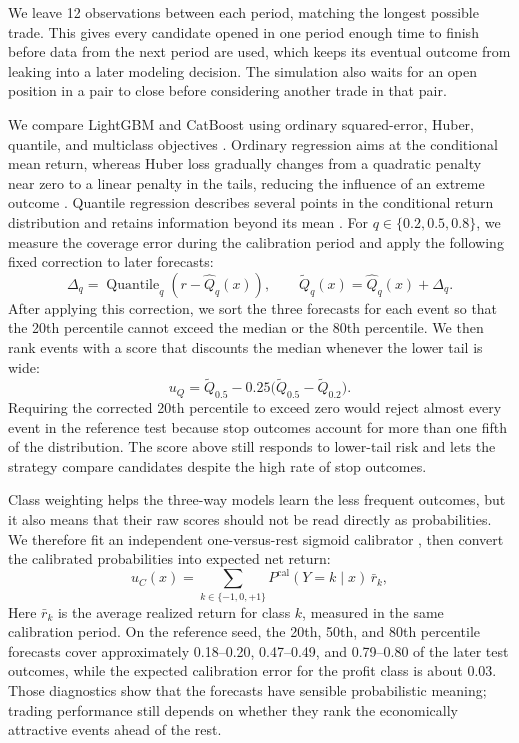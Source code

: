 \documentclass{strategynet-journal}
\begin{document}
We leave 12 observations between each period, matching the longest possible
trade.  This gives every candidate opened in one period enough time to finish
before data from the next period are used, which keeps its eventual outcome
from leaking into a later modeling decision.  The simulation also waits for an
open position in a pair to close before considering another trade in that pair.

We compare LightGBM and CatBoost using ordinary squared-error, Huber, quantile,
and multiclass objectives \cite{lightgbm,catboost}.  Ordinary regression aims
at the conditional mean return, whereas Huber loss gradually changes from a
quadratic penalty near zero to a linear penalty in the tails, reducing the
influence of an extreme outcome \cite{huber}.  Quantile regression describes
several points in the conditional return distribution and retains information
beyond its mean \cite{quantileregression}.  For
\(q\in\{0.2,0.5,0.8\}\), we measure the coverage error during the calibration
period and apply the following fixed correction to later forecasts:
\[
  \Delta_q=\operatorname{Quantile}_q(r-\widehat Q_q(x)),\qquad
  \widetilde Q_q(x)=\widehat Q_q(x)+\Delta_q.
\]
After applying this correction, we sort the three forecasts for each event so
that the 20th percentile cannot exceed the median or the 80th percentile.  We
then rank events with a score that discounts the median whenever the lower tail
is wide:
\[
  u_Q=\widetilde Q_{0.5}
      -0.25\bigl(\widetilde Q_{0.5}-\widetilde Q_{0.2}\bigr).
\]
Requiring the corrected 20th percentile to exceed zero would reject almost
every event in the reference test because stop outcomes account for more than
one fifth of the distribution.  The score above still responds to lower-tail
risk and lets the strategy compare candidates despite the high rate of stop
outcomes.

Class weighting helps the three-way models learn the less frequent outcomes,
but it also means that their raw scores should not be read directly as
probabilities.  We therefore fit an independent one-versus-rest sigmoid
calibrator \cite{sklearncalibration}, then convert the calibrated probabilities
into expected net return:
\[
  u_C(x)=\sum_{k\in\{-1,0,+1\}}
  P^{\mathrm{cal}}(Y=k\mid x)\,\bar r_k,
\]
Here \(\bar r_k\) is the average realized return for class \(k\), measured in
the same calibration period.  On the reference seed, the 20th, 50th, and 80th
percentile forecasts cover approximately 0.18--0.20, 0.47--0.49, and
0.79--0.80 of the later test outcomes, while the expected calibration error for
the profit class is about 0.03.  Those diagnostics show that the forecasts have
sensible probabilistic meaning; trading performance still depends on whether
they rank the economically attractive events ahead of the rest.
\end{document}
